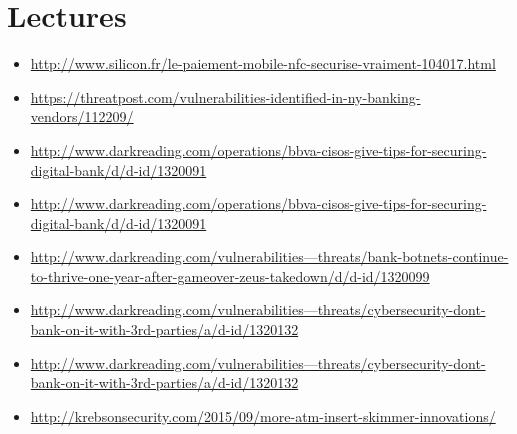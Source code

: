 \documentclass{article}
\begin{document}
\section{Lectures}
\begin{itemize}


\bigskip
\item
\href{NFC sécurisé ?
}{http://www.silicon.fr/le-paiement-mobile-nfc-securise-vraiment-104017.html
}

\item
\href{https://threatpost.com/vulnerabilities-identified-in-ny-banking-vendors/112209/
}{https://threatpost.com/vulnerabilities-identified-in-ny-banking-vendors/112209/
}


\bigskip
\item
\href{http://www.darkreading.com/operations/bbva-cisos-give-tips-for-securing-digital-bank/d/d-id/1320091
}{http://www.darkreading.com/operations/bbva-cisos-give-tips-for-securing-digital-bank/d/d-id/1320091
}

\bigskip
\item
\href{http://www.darkreading.com/operations/bbva-cisos-give-tips-for-securing-digital-bank/d/d-id/1320091
}{http://www.darkreading.com/operations/bbva-cisos-give-tips-for-securing-digital-bank/d/d-id/1320091
}

\bigskip
\item
\href{http://www.darkreading.com/vulnerabilities---threats/bank-botnets-continue-to-thrive-one-year-after-gameover-zeus-takedown/d/d-id/1320099
}{http://www.darkreading.com/vulnerabilities---threats/bank-botnets-continue-to-thrive-one-year-after-gameover-zeus-takedown/d/d-id/1320099
}

\bigskip
\item
\href{http://www.darkreading.com/vulnerabilities---threats/cybersecurity-dont-bank-on-it-with-3rd-parties/a/d-id/1320132
}{http://www.darkreading.com/vulnerabilities---threats/cybersecurity-dont-bank-on-it-with-3rd-parties/a/d-id/1320132
}

\bigskip
\item
\href{http://www.darkreading.com/vulnerabilities---threats/cybersecurity-dont-bank-on-it-with-3rd-parties/a/d-id/1320132
}{http://www.darkreading.com/vulnerabilities---threats/cybersecurity-dont-bank-on-it-with-3rd-parties/a/d-id/1320132
}

\bigskip
\item
\href{http://krebsonsecurity.com/2015/09/more-atm-insert-skimmer-innovations/
}{http://krebsonsecurity.com/2015/09/more-atm-insert-skimmer-innovations/
}


\end{itemize}
\end{document}
